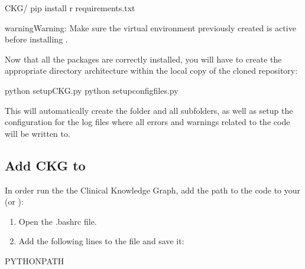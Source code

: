 \documentclass[letterpaper,10pt,english]{sphinxmanual}
\begin{document}
\begin{sphinxVerbatim}[commandchars=\\\{\}]
\PYGZdl{}  CKG/
\PYGZdl{} pip install \PYGZhy{}r requirements.txt
\end{sphinxVerbatim}

\begin{sphinxadmonition}{warning}{Warning:}
Make sure the virtual environment previously created is active before installing .
\end{sphinxadmonition}

Now that all the packages are correctly installed, you will have to create the appropriate directory architecture within the local copy of the cloned repository:

\begin{sphinxVerbatim}[commandchars=\\\{\}]
\PYGZdl{} python setup\PYGZus{}CKG.py
\PYGZdl{} python setup\PYGZus{}config\PYGZus{}files.py
\end{sphinxVerbatim}

This will automatically create the  folder and all subfolders, as well as setup the configuration for the log files where all errors and warnings related to the code will be written to.


\subsection{Add CKG to }
\label{\detokenize{intro/getting-started-with-build:add-ckg-to-bashrc}}
In order run the the Clinical Knowledge Graph, add the path to the code to your  (or ):
\begin{enumerate}
%
\item {} 
Open the .bashrc file.

\item {} 
Add the following lines to the file and save it:

\end{enumerate}

\begin{sphinxVerbatim}[commandchars=\\\{\}]
 PYTHONPATH
\end{sphinxVerbatim}
\end{document}

